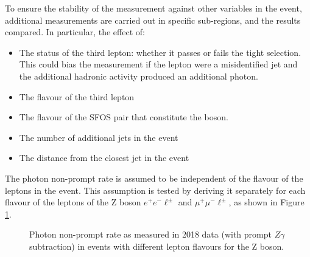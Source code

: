 To ensure the stability of the measurement against other variables in the event,
additional measurements are carried out in specific sub-regions, and the results compared.
In particular, the effect of:
\begin{itemize}
\item The status of the third lepton: whether it passes or fails the tight selection.
  This could bias the measurement if the lepton were a misidentified jet and the additional hadronic activity produced an additional \nonprompt photon.
\item The flavour of the third lepton
\item The flavour of the SFOS pair that constitute the \PZ boson.
\item The number of additional jets in the event
\item The distance from the closest jet in the event
\end{itemize}


The photon non-prompt rate is assumed to be independent of the flavour of the leptons in the event.
This assumption is tested by deriving it separately for each flavour of the leptons of the Z boson $e^+ e^- \ell^\pm$ and $\mu^+ \mu^- \ell^\pm$, as shown in Figure \ref{fig:phFR_2e2m}.

\begin{figure}
\caption{Photon non-prompt rate as measured in 2018 data (with prompt $Z\gamma$ subtraction) in events with different lepton flavours for the Z boson.}
\label{fig:phFR_2e2m}
\end{figure}

